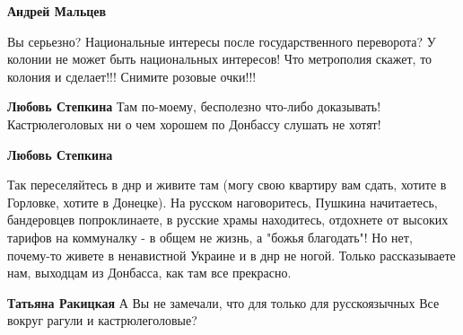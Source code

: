 \begin{itemize}
\begin{itemize}
 
\textbf{Андрей Мальцев} 

Вы серьезно? Национальные интересы после
государственного переворота? У колонии не может быть национальных интересов! Что
метрополия скажет, то колония и сделает!!! Снимите розовые очки!!!


 
\textbf{Любовь Степкина} Там по-моему, бесполезно что-либо доказывать!
Кастрюлеголовых ни о чем хорошем по Донбассу слушать не хотят!

 
\textbf{Любовь Степкина} 

Так переселяйтесь в днр и живите там (могу свою
квартиру вам сдать, хотите в Горловке, хотите в Донецке). На русском
наговоритесь, Пушкина начитаетесь, бандеровцев попроклинаете, в русские храмы
находитесь, отдохнете от высоких тарифов на коммуналку - в общем не жизнь, а
"божья благодать"! Но нет, почему-то живете в ненавистной Украине и в днр не
ногой. Только рассказываете нам, выходцам из Донбасса, как там все прекрасно.

 
\textbf{Татьяна Ракицкая} А Вы не замечали, что для только для русскоязычных Все вокруг рагули и кастрюлеголовые?

 

\end{itemize}
\end{itemize}
